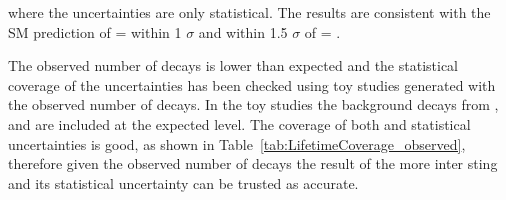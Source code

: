 {where the uncertainties are only statistical. The results are consistent with the SM prediction of \tmumu = \tH within  1 $\sigma$ and within  1.5 $\sigma$ of \tmumu = \tL.

The observed number of decays is lower than expected and the statistical coverage of the uncertainties has been checked using toy studies generated with the observed number of decays. In the toy studies the background decays from \bhh, \bdmumu and \lambdab are included at the expected level. The coverage of both \tmumu and \Gmumu statistical uncertainties is good, as shown in Table~\ref{tab:LifetimeCoverage_observed}, therefore given the observed number of decays the result of the more inter sting \tmumu and its statistical uncertainty can be trusted as accurate. %



}
